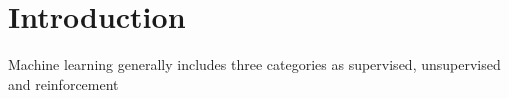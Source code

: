 \section{Introduction}

Machine learning generally includes three categories as supervised, unsupervised and reinforcement 
